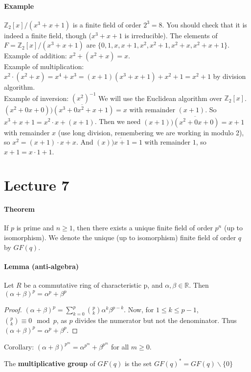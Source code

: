 \documentclass[10pt,letter]{article}
\theoremstyle{plain}
\theoremstyle{definition}
\begin{document}
\paragraph{Example}
$\mathbb{Z}_2[x]/(x^3+x+1)$ is a finite field of order $2^3=8$. You should check that it is indeed a finite field, though ($x^3+x+1$ is irreducible). The elements of $F=\mathbb{Z}_2[x]/(x^3+x+1)$ are $\{0,1,x,x+1,x^2,x^2+1,x^2+x,x^2+x+1\}$. \\ 
Example of addition: $x^2+(x^2+x)=x$. \\ 
Example of multiplication: $x^2\cdot(x^2+x)=x^4+x^3=(x+1)(x^3+x+1)+x^2+1=x^2+1$ by division algorithm.\\ 
Example of inversion: $(x^2)^{-1}$ We will use the Euclidean algorithm over $\mathbb{Z}_2[x]$. $(x^2+0x+0)\overline{\big)(x^3+0x^2+x+1)}=x$ with remainder $(x+1)$. So $x^3+x+1=x^2\cdot x+(x+1)$. Then we need $(x+1)\overline{\big)(x^2+0x+0)}=x+1$ with remainder $x$ (use long division, remembering we are working in modulo 2), so $x^2=(x+1)\cdot x+x$. And $(x)\overline{\big)x+1} = 1$ with remainder $1$, so $x+1=x\cdot1+1$. 


\section*{Lecture 7}
\paragraph{Theorem}
If $p$ is prime and $n\geq1$, then there exists a unique finite field of order $p^n$ (up to isomorphism). We denote the unique (up to isomorphism) finite field of order $q$ by $GF(q)$. 

\paragraph{Lemma (anti-algebra)}
Let $R$ be a commutative ring of characteristic p, and $\alpha,\beta\in\mathbb{R}$. Then $(\alpha+\beta)^p=\alpha^p+\beta^p$ 
\begin{proof}
     $(\alpha+\beta)^p=\sum_{k=0}^p{p\choose k}\alpha^k\beta^{p-k}$. Now, for $1\leq k\leq p-1$, ${p\choose k}\equiv 0\mod{p}$, as $p$ divides the numerator but not the denominator. Thus $(\alpha+\beta)^p=\alpha^p+\beta^p$. 
\end{proof}
Corollary: $(\alpha+\beta)^{p^m}=\alpha^{p^m}+\beta^{p^m}$ for all $m\geq 0$. 

The \textbf{multiplicative group} of $GF(q)$ is the set $GF(q)^*=GF(q)\backslash\{0\}$
\end{document}

